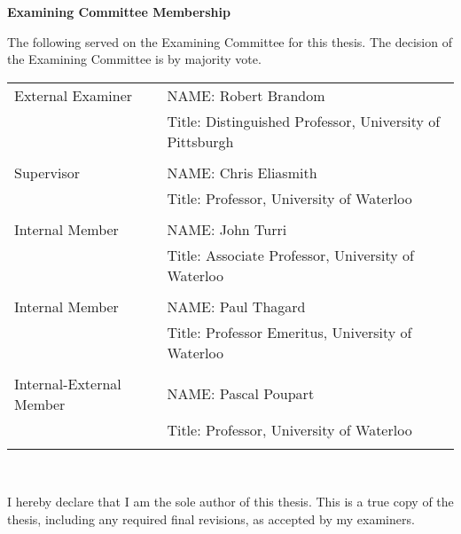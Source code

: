 \cleardoublepage %
 
\begin{center}\textbf{Examining Committee Membership}\end{center}

The following served on the Examining Committee for this thesis. The decision of the Examining Committee is by majority vote.

\vskip 0.12in
\begin{tabular}{l l} 

External Examiner  &  NAME: Robert Brandom  \\
  &  Title: Distinguished Professor, University of Pittsburgh \\
  & \\ 
Supervisor  &  NAME: Chris Eliasmith \\
  & Title: Professor, University of Waterloo \\
  & \\ 
Internal Member  &  NAME: John Turri \\ 
 & Title: Associate Professor, University of Waterloo \\
 & \\ 
Internal Member  &  NAME: Paul Thagard \\
 & Title: Professor Emeritus, University of Waterloo \\
 & \\ 
Internal-External Member  &  NAME: Pascal Poupart \\
 & Title: Professor, University of Waterloo \\
   & \\

\end{tabular} 


\cleardoublepage 


  \noindent
I hereby declare that I am the sole author of this thesis. This is a true copy of the thesis, including any required final revisions, as accepted by my examiners.

  \bigskip
  
